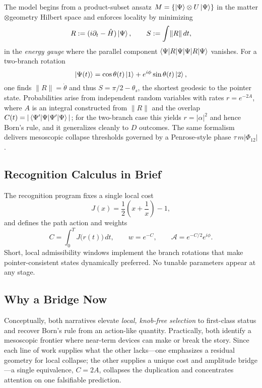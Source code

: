 \documentclass[11pt,letterpaper]{article}
\begin{document}
The model begins from a product-subset ansatz $M=\{\ket{\Psi}\otimes U\ket{\Psi}\}$ in the matter$\otimes$geometry Hilbert space and enforces locality by minimizing
\begin{equation}
R:=(i\partial_t-\hat{H})\ket{\Psi},\qquad S:=\int\!\|R\|\,dt,
\end{equation}
in the \emph{energy gauge} where the parallel component $\braket{\Psi|R|\Psi}$ vanishes. For a two-branch rotation
\[
\ket{\Psi(t)}=\cos\theta(t)\ket{1}+e^{i\phi}\sin\theta(t)\ket{2},
\]
one finds $\|R\|=\dot{\theta}$ and thus $S=\pi/2-\theta_s$, the shortest geodesic to the pointer state. Probabilities arise from independent random variables with rates $r=e^{-2A}$, where $A$ is an integral constructed from $\|R\|$ and the overlap $C(t)=|\braket{\Psi'|\Psi}|$; for the two-branch case this yields $r=|\alpha|^2$ and hence Born's rule, and it generalizes cleanly to $D$ outcomes. The same formalism delivers mesoscopic collapse thresholds governed by a Penrose-style phase $\tau\,m|\Phi_{12}|$.

\subsection{Recognition Calculus in Brief}

The recognition program fixes a single local cost
\begin{equation}
J(x)=\frac{1}{2}\left(x+\frac{1}{x}\right)-1,
\end{equation}
and defines the path action and weights
\begin{equation}
C=\int_0^T J\bigl(r(t)\bigr)\,dt,\qquad w=e^{-C},\qquad \mathcal{A}=e^{-C/2}e^{i\phi}.
\end{equation}
Short, local admissibility windows implement the branch rotations that make pointer-consistent states dynamically preferred. No tunable parameters appear at any stage.

\subsection{Why a Bridge Now}

Conceptually, both narratives elevate \emph{local, knob-free selection} to first-class status and recover Born's rule from an action-like quantity. Practically, both identify a mesoscopic frontier where near-term devices can make or break the story. Since each line of work supplies what the other lacks---one emphasizes a residual geometry for local collapse; the other supplies a unique cost and amplitude bridge---a single equivalence, $C=2A$, collapses the duplication and concentrates attention on one falsifiable prediction.
\end{document}

